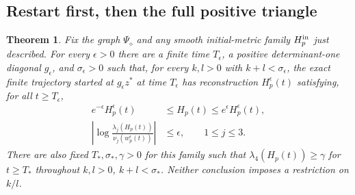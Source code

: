 \documentclass[11pt]{amsart}
\newtheorem{theorem}{Theorem}[section]
\theoremstyle{definition}
\theoremstyle{remark}
\begin{document}
\subsection{Restart first, then the full positive triangle}
\begin{theorem}\label{thm:diamond-prescribed}
Fix the graph $\Psi_\diamond$ and any smooth initial-metric
family $H_p^{\rm in}$ just described. For every $\epsilon>0$
there are a finite time $T_\epsilon$, a positive determinant-one
diagonal $g_\epsilon$, and $\sigma_\epsilon>0$ such that,
for every $k,l>0$ with $k+l<\sigma_\epsilon$, the exact finite
trajectory started at $g_\epsilon z^*$ at time $T_\epsilon$
has reconstruction $H_p^\epsilon(t)$ satisfying, for all
$t\ge T_\epsilon$,
\begin{equation}\label{eq:diamond-prescribed}
 \begin{aligned}
 e^{-\epsilon}H_p^\epsilon(t)&\le H_p(t)
                                  \le e^\epsilon H_p^\epsilon(t),\\
 \left|\log\frac{\lambda_j(H_p(t))}
                      {\nu_j(w_p^\epsilon(t))}\right|
      &\le\epsilon,\qquad 1\le j\le3 .
 \end{aligned}
\end{equation}
There are also fixed $T_*,\sigma_*,\gamma>0$ for this family
such that $\lambda_4(H_p(t))\ge\gamma$ for $t\ge T_*$
throughout $k,l>0$, $k+l<\sigma_*$. Neither conclusion imposes
a restriction on $k/l$.
\end{theorem}
\end{document}

